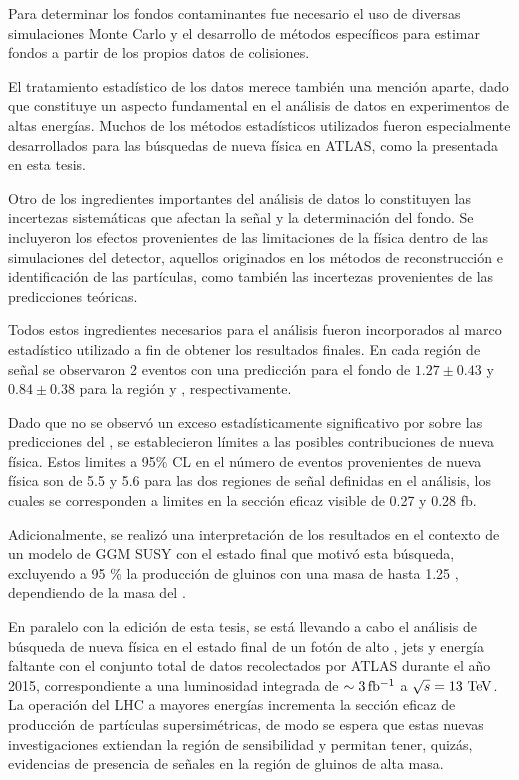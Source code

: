 Para determinar los fondos contaminantes fue necesario el uso de diversas
simulaciones Monte Carlo y el desarrollo de métodos específicos para estimar fondos a
partir de los propios datos de colisiones.

El tratamiento estadístico de los datos merece también una mención aparte, dado
que constituye un aspecto fundamental en el análisis de datos en experimentos de
altas energías. Muchos de los métodos estadísticos utilizados fueron
especialmente desarrollados para las búsquedas de nueva física en ATLAS, como la
presentada en esta tesis.

Otro de los ingredientes importantes del análisis de datos lo constituyen las
incertezas sistemáticas que afectan la señal y la determinación del fondo. Se
incluyeron los efectos provenientes de las limitaciones de la física dentro de
las simulaciones del detector, aquellos originados en los métodos de
reconstrucción e identificación de las partículas, como también las incertezas
provenientes de las predicciones teóricas.

Todos estos ingredientes necesarios para el análisis fueron incorporados al
marco estadístico utilizado a fin de obtener los resultados finales. En cada
región de señal se observaron 2 eventos con una predicción para el fondo de
$1.27\pm0.43$ y $0.84\pm 0.38$ para la región {\SRL} y {\SRH}, respectivamente.

Dado que no se observó un exceso estadísticamente significativo por sobre las predicciones del
{\SM}, se establecieron límites a las posibles contribuciones de nueva física.
Estos limites a 95\% CL en el número de eventos provenientes de nueva física son
de 5.5 y 5.6 para las dos regiones de señal definidas en el análisis, los cuales
se corresponden a limites en la sección eficaz visible de 0.27 y 0.28 fb.

Adicionalmente, se realizó una interpretación de los resultados en el contexto
de un modelo de GGM SUSY con el estado final que motivó esta búsqueda, excluyendo
a 95 \% {\cl} la producción de gluinos con una masa de hasta 1.25 \tev, dependiendo de la masa
del {\ninoone}.

En paralelo con la edición de esta tesis, se está llevando a cabo el análisis de
búsqueda de nueva física en el estado final de un fotón de alto {\pt}, jets y
energía faltante con el conjunto total de datos recolectados por ATLAS durante
el a\~no 2015, correspondiente a una luminosidad integrada de $\sim
\unit[3]{fb^{-1}}$ a $\sqrt{s}=13 \tev$. La operación del LHC a
mayores energías incrementa la sección eficaz de producción de partículas
supersimétricas, de modo se espera que estas nuevas investigaciones extiendan la región de
sensibilidad y permitan tener, quizás, evidencias de presencia de se\~nales en la
región de gluinos de alta masa.
